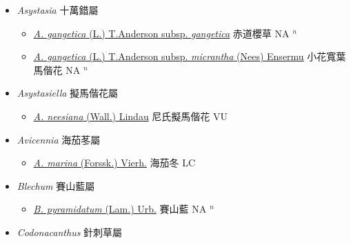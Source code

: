 
  \begin{itemize}
 \item[] \textit{Asystasia} 十萬錯屬
                    
  \begin{itemize}
        \item[] \href{http://www.theplantlist.org/tpl1.1/search?q=Asystasia+gangetica+subsp.+gangetica}{\textit{A. gangetica} (L.) T.Anderson subsp. \textit{gangetica}}   赤道櫻草 NA $^n$
        \item[] \href{http://www.theplantlist.org/tpl1.1/search?q=Asystasia+gangetica+subsp.+micrantha}{\textit{A. gangetica} (L.) T.Anderson subsp. \textit{micrantha} (Nees) Ensermu}   小花寬葉馬偕花 NA $^n$
  \end{itemize}
 \item[] \textit{Asystasiella} 擬馬偕花屬
                    
  \begin{itemize}
        \item[] \href{http://www.theplantlist.org/tpl1.1/search?q=Asystasiella+neesiana}{\textit{A. neesiana} (Wall.) Lindau}   尼氏擬馬偕花 VU
  \end{itemize}
 \item[] \textit{Avicennia} 海茄苳屬
                    
  \begin{itemize}
        \item[] \href{http://www.theplantlist.org/tpl1.1/search?q=Avicennia+marina}{\textit{A. marina} (Forssk.) Vierh.}   海茄冬 LC
  \end{itemize}
 \item[] \textit{Blechum} 賽山藍屬
                    
  \begin{itemize}
        \item[] \href{http://www.theplantlist.org/tpl1.1/search?q=Blechum+pyramidatum}{\textit{B. pyramidatum} (Lam.) Urb.}   賽山藍 NA $^n$
  \end{itemize}
 \item[] \textit{Codonacanthus} 針刺草屬
                    

\end{itemize}
